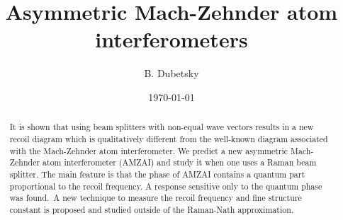 \documentclass[twocolumn,showpacs,preprintnumbers]{revtex4}
\begin{document}
\title{Asymmetric Mach-Zehnder atom interferometers}
\author{B. Dubetsky}
\date{\today }

\begin{abstract}
It is shown that using beam splitters with non-equal wave vectors results in
a new recoil diagram which is qualitatively different from the well-known
diagram associated with the Mach-Zehnder atom interferometer. We predict a
new asymmetric Mach-Zehnder atom interferometer (AMZAI) and study it when
one uses a Raman beam splitter. The main feature is that the phase of AMZAI
contains a quantum part proportional to the recoil frequency. A response
sensitive only to the quantum phase was found.{\large \ }A new technique to
measure the recoil frequency and fine structure constant is proposed and
studied outside of the Raman-Nath approximation.
\end{abstract}

\maketitle
\end{document}
